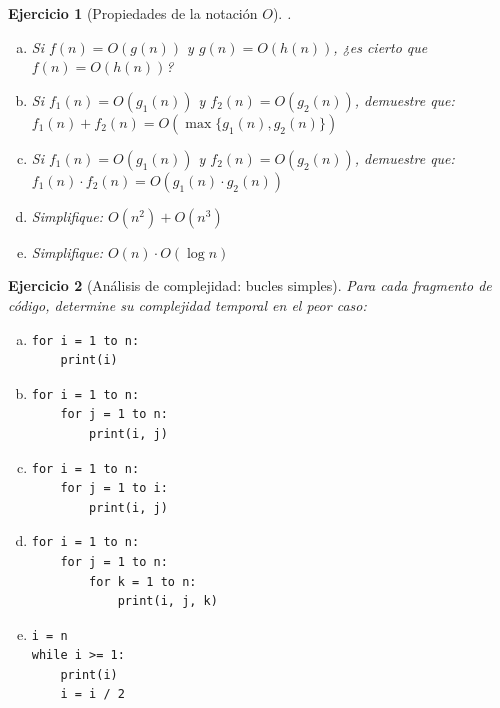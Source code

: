 \documentclass[12pt]{article}
\newtheorem{exercise}{Ejercicio}
\begin{document}
\begin{exercise}[Propiedades de la notación $O$].
\begin{enumerate}[(a)]
\item Si $f(n) = O(g(n))$ y $g(n) = O(h(n))$, ¿es cierto que $f(n) = O(h(n))$?
\item Si $f_1(n) = O(g_1(n))$ y $f_2(n) = O(g_2(n))$, demuestre que:
$f_1(n) + f_2(n) = O(\max\{g_1(n), g_2(n)\})$
\item Si $f_1(n) = O(g_1(n))$ y $f_2(n) = O(g_2(n))$, demuestre que:
$ f_1(n) \cdot f_2(n) = O(g_1(n) \cdot g_2(n))$
\item Simplifique: $O(n^2) + O(n^3)$
\item Simplifique: $O(n) \cdot O(\log n)$
\end{enumerate}
\end{exercise}

\begin{exercise}[Análisis de complejidad: bucles simples]
Para cada fragmento de código, determine su complejidad temporal en el peor caso:
\begin{enumerate}[(a)]
\item 
\begin{verbatim}
for i = 1 to n:
    print(i)
\end{verbatim}
\item 
\begin{verbatim}
for i = 1 to n:
    for j = 1 to n:
        print(i, j)
\end{verbatim}
\item 
\begin{verbatim}
for i = 1 to n:
    for j = 1 to i:
        print(i, j)
\end{verbatim}
\item 
\begin{verbatim}
for i = 1 to n:
    for j = 1 to n:
        for k = 1 to n:
            print(i, j, k)
\end{verbatim}
\item 
\begin{verbatim}
i = n
while i >= 1:
    print(i)
    i = i / 2
\end{verbatim}
\end{enumerate}
\end{exercise}
\end{document}
